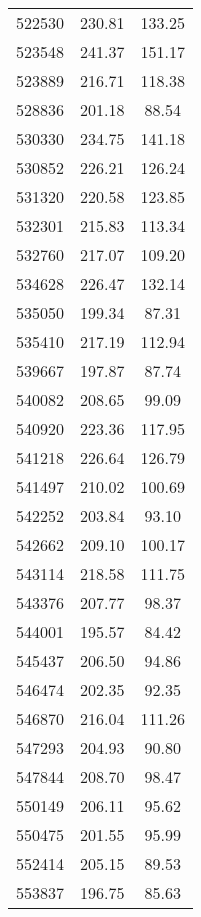 \documentclass[main.tex]{subfiles}
\begin{document}
\begin{longtable}{ccc}
		522530     & 230.81       & 133.25       \\
		523548     & 241.37       & 151.17       \\
		523889     & 216.71       & 118.38       \\
		528836     & 201.18       & 88.54        \\
		530330     & 234.75       & 141.18       \\
		530852     & 226.21       & 126.24       \\
		531320     & 220.58       & 123.85       \\
		532301     & 215.83       & 113.34       \\
		532760     & 217.07       & 109.20       \\
		534628     & 226.47       & 132.14       \\
		535050     & 199.34       & 87.31        \\
		535410     & 217.19       & 112.94       \\
		539667     & 197.87       & 87.74        \\
		540082     & 208.65       & 99.09        \\
		540920     & 223.36       & 117.95       \\
		541218     & 226.64       & 126.79       \\
		541497     & 210.02       & 100.69       \\
		542252     & 203.84       & 93.10        \\
		542662     & 209.10       & 100.17       \\
		543114     & 218.58       & 111.75       \\
		543376     & 207.77       & 98.37        \\
		544001     & 195.57       & 84.42        \\
		545437     & 206.50       & 94.86        \\
		546474     & 202.35       & 92.35        \\
		546870     & 216.04       & 111.26       \\
		547293     & 204.93       & 90.80        \\
		547844     & 208.70       & 98.47        \\
		550149     & 206.11       & 95.62        \\
		550475     & 201.55       & 95.99        \\
		552414     & 205.15       & 89.53        \\
		553837     & 196.75       & 85.63        \\

\end{longtable}
\end{document}
